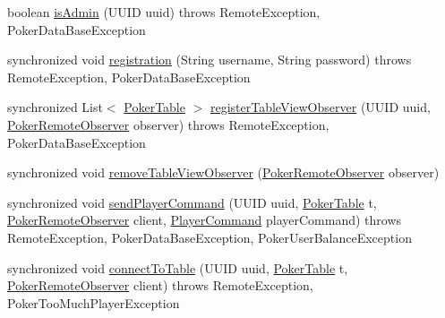 \begin{DoxyCompactItemize}
\item 
boolean \hyperlink{classhu_1_1elte_1_1bfw1p6_1_1poker_1_1server_1_1_poker_remote_impl_a89150f105180196a3a441df962322dcb}{is\+Admin} (U\+U\+I\+D uuid)  throws Remote\+Exception, Poker\+Data\+Base\+Exception 
\item 
synchronized void \hyperlink{classhu_1_1elte_1_1bfw1p6_1_1poker_1_1server_1_1_poker_remote_impl_adeec97474b4d71b913a06dd1fea739f9}{registration} (String username, String password)  throws Remote\+Exception, Poker\+Data\+Base\+Exception 
\item 
synchronized List$<$ \hyperlink{classhu_1_1elte_1_1bfw1p6_1_1poker_1_1model_1_1entity_1_1_poker_table}{Poker\+Table} $>$ \hyperlink{classhu_1_1elte_1_1bfw1p6_1_1poker_1_1server_1_1_poker_remote_impl_ad0693a6785f09836135e8c8bb5c175f3}{register\+Table\+View\+Observer} (U\+U\+I\+D uuid, \hyperlink{interfacehu_1_1elte_1_1bfw1p6_1_1poker_1_1client_1_1observer_1_1_poker_remote_observer}{Poker\+Remote\+Observer} observer)  throws Remote\+Exception, Poker\+Data\+Base\+Exception 
\item 
synchronized void \hyperlink{classhu_1_1elte_1_1bfw1p6_1_1poker_1_1server_1_1_poker_remote_impl_af1801d5471e3a9382d6deb1698c65da0}{remove\+Table\+View\+Observer} (\hyperlink{interfacehu_1_1elte_1_1bfw1p6_1_1poker_1_1client_1_1observer_1_1_poker_remote_observer}{Poker\+Remote\+Observer} observer)
\item 
synchronized void \hyperlink{classhu_1_1elte_1_1bfw1p6_1_1poker_1_1server_1_1_poker_remote_impl_ac049557195515bd6f63b156dead3527b}{send\+Player\+Command} (U\+U\+I\+D uuid, \hyperlink{classhu_1_1elte_1_1bfw1p6_1_1poker_1_1model_1_1entity_1_1_poker_table}{Poker\+Table} t, \hyperlink{interfacehu_1_1elte_1_1bfw1p6_1_1poker_1_1client_1_1observer_1_1_poker_remote_observer}{Poker\+Remote\+Observer} client, \hyperlink{classhu_1_1elte_1_1bfw1p6_1_1poker_1_1command_1_1_player_command}{Player\+Command} player\+Command)  throws Remote\+Exception, Poker\+Data\+Base\+Exception, Poker\+User\+Balance\+Exception 
\item 
synchronized void \hyperlink{classhu_1_1elte_1_1bfw1p6_1_1poker_1_1server_1_1_poker_remote_impl_a4d6f058040648037c975b5b2a2eb59dc}{connect\+To\+Table} (U\+U\+I\+D uuid, \hyperlink{classhu_1_1elte_1_1bfw1p6_1_1poker_1_1model_1_1entity_1_1_poker_table}{Poker\+Table} t, \hyperlink{interfacehu_1_1elte_1_1bfw1p6_1_1poker_1_1client_1_1observer_1_1_poker_remote_observer}{Poker\+Remote\+Observer} client)  throws Remote\+Exception, Poker\+Too\+Much\+Player\+Exception 
\item 

\end{DoxyCompactItemize}
